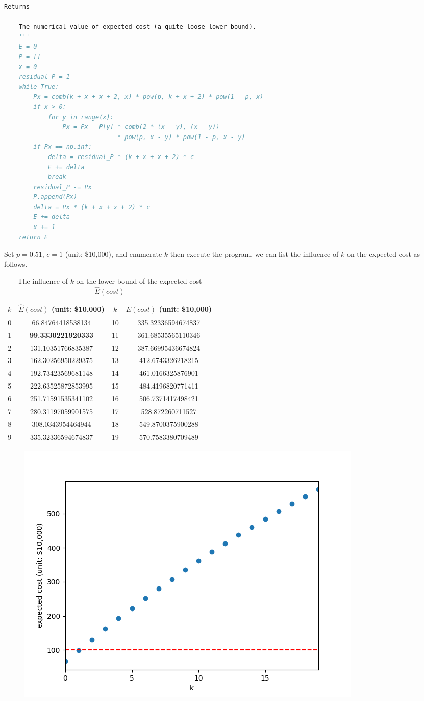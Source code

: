 \documentclass{oxmathproblems}
\makeatletter
\theoremstyle{definition}
\renewenvironment{solution}[1][Solution] {\par\pushQED{\qed}\normalfont\topsep6\p@\@plus6\p@\relax\trivlist\item[\hskip\labelsep\bfseries#1\@addpunct{.}]\ignorespaces}{\popQED\endtrivlist\@endpefalse} \makeatother
\makeatother
\begin{document}
\begin{solution}
\begin{lstlisting}[language=python]
    Returns
    -------
    The numerical value of expected cost (a quite loose lower bound).
    '''
    E = 0
    P = []
    x = 0
    residual_P = 1
    while True:
        Px = comb(k + x + x + 2, x) * pow(p, k + x + 2) * pow(1 - p, x)
        if x > 0:
            for y in range(x):
                Px = Px - P[y] * comb(2 * (x - y), (x - y)) 
                               * pow(p, x - y) * pow(1 - p, x - y)
        if Px == np.inf:
            delta = residual_P * (k + x + x + 2) * c
            E += delta
            break
        residual_P -= Px
        P.append(Px)
        delta = Px * (k + x + x + 2) * c
        E += delta
        x += 1
    return E 
\end{lstlisting}
	Set $p = 0.51$, $c = 1$ (unit: \$10,000), and enumerate $k$ then execute the program, we can list the influence of $k$ on the expected cost as follows.
	\begin{table}[htbp]
		\centering
		\caption{The influence of $k$ on the lower bound of the expected cost $\hat{E}(cost)$}
		\label{tab1}
		\begin{tabular}{|c|c|c|c|}  
			\hline  %
			$k$ & $\hat{E}(cost)$ (unit: \$10,000) & $k$ & $E(cost)$ (unit: \$10,000)\\ \hline
			0 & 66.84764418538134 &10 & 335.32336594674837 \\
			1 & \textbf{99.3330221920333} &11 & 361.68535565110346 \\
			2 & 131.10351766835387 &12 & 387.66995436674824 \\
			3 & 162.30256950229375 & 13 & 412.6743326218215 \\
			4 & 192.73423569681148 & 14 & 461.0166325876901 \\
			5 & 222.63525872853995 & 15 & 484.4196820771411 \\
			6 & 251.71591535341102 & 16 & 506.7371417498421 \\
			7 & 280.31197059901575 &17 & 528.872260711527 \\
			8 & 308.0343954464944 & 18 & 549.8700375900288\\
			9 & 335.32336594674837 &19 & 570.7583380709489 \\ \hline	
		\end{tabular}
	\end{table}
	\begin{figure}[htbp]
		\centering
		\includegraphics[width=0.7\linewidth]{2.png}

\end{figure}
\end{solution}
\end{document}
